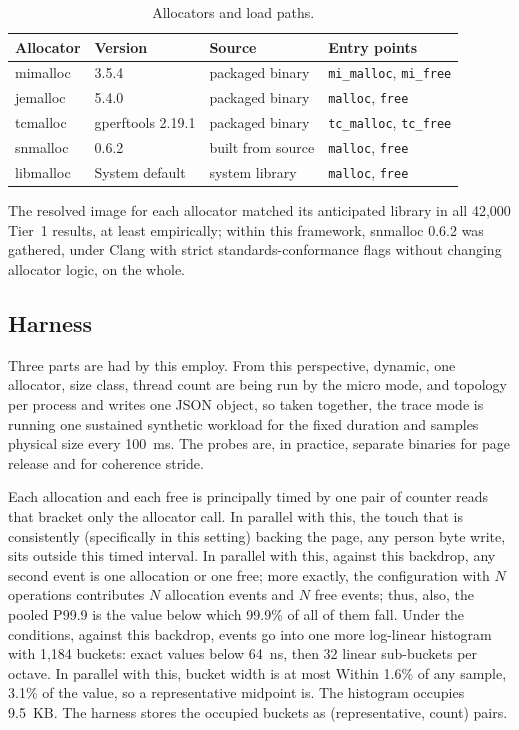 \begin{table}[t]
\centering
\footnotesize
\caption{Allocators and load paths.}
\label{tab:allocators}
\begin{tabular}{llll}
\toprule
Allocator & Version & Source & Entry points \\
\midrule
mimalloc & 3.5.4 & packaged binary & \texttt{mi\_malloc}, \texttt{mi\_free} \\
jemalloc & 5.4.0 & packaged binary & \texttt{malloc}, \texttt{free} \\
tcmalloc & gperftools 2.19.1 & packaged binary & \texttt{tc\_malloc}, \texttt{tc\_free} \\
snmalloc & 0.6.2 & built from source & \texttt{malloc}, \texttt{free} \\
libmalloc & System default & system library & \texttt{malloc}, \texttt{free} \\
\bottomrule
\end{tabular}
\end{table}

The resolved image for each allocator matched its anticipated library in all 42{,}000 Tier~1 results, at least empirically; within this framework, snmalloc 0.6.2 was gathered, under Clang with strict standards-conformance flags without changing allocator logic, on the whole.

\subsection{Harness}
Three parts are had by this employ. From this perspective, dynamic, one allocator, size class, thread count are being run by the micro mode,
and topology per process and writes one JSON object, so taken together, the trace mode is running one sustained
synthetic workload for the fixed duration and samples physical size every 100~ms. The
probes are, in practice, separate binaries for page release and for coherence stride.

Each allocation and each free is principally timed by one pair of counter reads that bracket only the
allocator call. In parallel with this, the touch that is consistently (specifically in this setting) backing the page, any person byte write, sits outside this timed
interval. In parallel with this, against this backdrop, any second event is one allocation or one free; more exactly, the configuration with $N$ operations
contributes $N$ allocation events and $N$ free events; thus, also, the pooled P99.9 is the value below
which 99.9\% of all of them fall. Under the conditions, against this backdrop, events go into one more log-linear histogram with 1{,}184 buckets:
exact values below 64~ns, then 32 linear sub-buckets per octave. In parallel with this, bucket width is at most
Within 1.6\% of any sample, 3.1\% of the value, so a representative midpoint is. The histogram
occupies 9.5~KB. The harness stores the occupied buckets as (representative, count) pairs.

